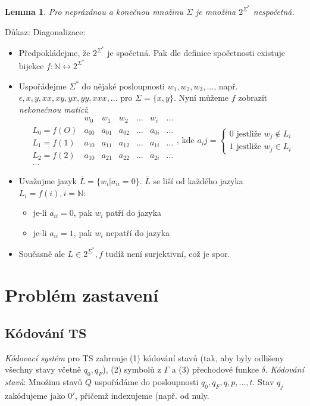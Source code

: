 \documentclass[a4paper, 11pt]{report}
\newtheorem{lemma}{Lemma}[chapter]
\begin{document}
\begin{lemma}
Pro neprázdnou a konečnou množinu $\Sigma$ je množina $2^{\Sigma^*}$ nespočetná.
\end{lemma}
Důkaz: Diagonalizace:
\begin{itemize}
	\item Předpokládejme, že $2^{\Sigma^*}$ je spočetná. Pak dle definice spočetnosti existuje bijekce $f: \mathbb{N} \leftrightarrow 2^{\Sigma^*}$
	\item Uspořádejme $\Sigma^*$ do nějaké posloupnosti $w_1, w_2, w_3, \dots$, např. $\epsilon, x, y, xx, xy, yx, yy, xxx, \dots$ pro $\Sigma = \{x, y\}$. Nyní můžeme $f$ zobrazit \emph{nekonečnou maticí}:
	$$\begin{matrix}
				& w_0		& w_1		& w_2		& \dots	& w_i		& \dots \\
	L_0 = f(O)	& a_{00}	& a_{01}	& a_{02}	& \dots	& a_{0i}	& \dots \\
	L_1 = f(1)	& a_{10}	& a_{11}	& a_{12}	& \dots	& a_{1i}	& \dots \\
	L_2 = f(2)	& a_{10}	& a_{21}	& a_{22}	& \dots	& a_{2i}	& \dots \\
	\dots
	\end{matrix} \text{, kde } a_ij = 
	\begin{cases}
		0 \text{ jestliže } w_j \not\in L_i \\
		1 \text{ jestliže } w_j \in L_i
	\end{cases}$$
	\item Uvažujme jazyk $\overline{L} = \{w_i | a_{ii} = 0\}$. $\overline{L}$ se liší od každého jazyka $L_i = f(i), i = \mathbb{N}$:
	\begin{itemize}
		\item je-li $a_{ii} = 0$, pak $w_i$ patří do jazyka
		\item je-li $a_{ii} = 1$, pak $w_i$ nepatří do jazyka
	\end{itemize}
	\item Současně ale $\overline{L} \in 2^{\Sigma^*}, f$ tudíž není surjektivní, což je spor.
\end{itemize}

\section{Problém zastavení}
\subsection{Kódování TS}
\emph{Kódovací systém} pro TS zahrnuje (1) kódování stavů (tak, aby byly odlišeny všechny stavy včetně $q_0, q_F$), (2) symbolů z $\Gamma$ a (3) přechodové funkce $\delta$. \emph{Kódování stavů}: Množinu stavů $Q$ uspořádáme do posloupnosti $q_0, q_F, q, p, \dots, t$. Stav $q_j$ zakódujeme jako $0^j$, přičemž indexujeme (např. od nuly.
\end{document}
